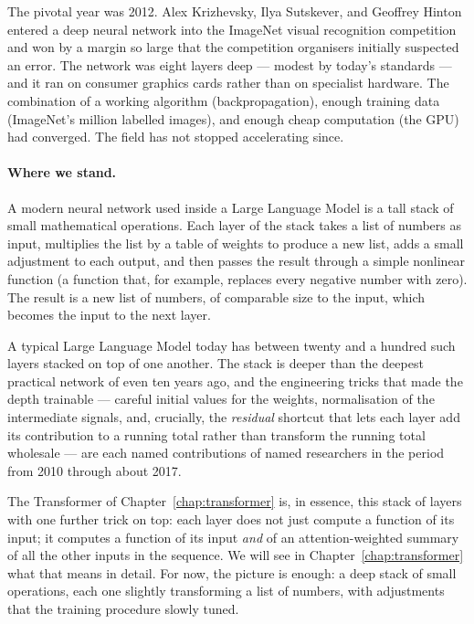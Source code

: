 The pivotal year was 2012. Alex Krizhevsky, Ilya Sutskever, and
Geoffrey Hinton entered a deep neural network into the ImageNet
visual recognition competition and won by a margin so large
that the competition organisers initially suspected an error.
The network was eight layers deep --- modest by today's
standards --- and it ran on consumer graphics cards rather than
on specialist hardware. The combination of a working algorithm
(backpropagation), enough training data (ImageNet's million
labelled images), and enough cheap computation (the GPU) had
converged. The field has not stopped accelerating since.

\paragraph{Where we stand.} A modern neural network used inside a Large Language Model is a
tall stack of small mathematical operations. Each layer of the
stack takes a list of numbers as input, multiplies the list by a
table of weights to produce a new list, adds a small adjustment
to each output, and then passes the result through a simple
nonlinear function (a function that, for example, replaces every
negative number with zero). The result is a new list of
numbers, of comparable size to the input, which becomes the
input to the next layer.

A typical Large Language Model today has between twenty and a
hundred such layers stacked on top of one another. The stack is
deeper than the deepest practical network of even ten years ago,
and the engineering tricks that made the depth trainable ---
careful initial values for the weights, normalisation of the
intermediate signals, and, crucially, the \emph{residual}
shortcut that lets each layer add its contribution to a running
total rather than transform the running total wholesale --- are
each named contributions of named researchers in the period from
2010 through about 2017.

The Transformer of Chapter~\ref{chap:transformer} is, in essence, this stack of
layers with one further trick on top: each layer does not just
compute a function of its input; it computes a function of its
input \emph{and} of an attention-weighted summary of all the
other inputs in the sequence. We will see in Chapter~\ref{chap:transformer} what
that means in detail. For now, the picture is enough: a deep
stack of small operations, each one slightly transforming a
list of numbers, with adjustments that the training procedure
slowly tuned.

